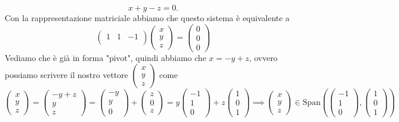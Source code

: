 $$
  x + y - z = 0.
$$
Con la rappresentazione matriciale abbiamo che questo sistema è equivalente a
$$
  \begin{pmatrix}
    1 & 1 & -1 \\
  \end{pmatrix} \begin{pmatrix}
  x \\
  y \\
  z
  \end{pmatrix} = \begin{pmatrix}
  0 \\
  0 \\
  0
  \end{pmatrix}
$$
Vediamo che è già in forma "pivot", quindi abbiamo che $x = -y + z$, ovvero possiamo scrivere il nostro vettore $\begin{pmatrix}
x \\
y \\
z
\end{pmatrix}$ come
$$
  \begin{pmatrix}
  x \\
  y \\
  z
  \end{pmatrix} = \begin{pmatrix}
    -y + z \\
    y \\
    z
  \end{pmatrix} = \begin{pmatrix}
    -y \\
    y \\
    0
  \end{pmatrix} + \begin{pmatrix}
    z \\
    0 \\
    z
  \end{pmatrix} = y\begin{pmatrix}
    -1 \\
    1 \\
    0
  \end{pmatrix} + z\begin{pmatrix}
    1 \\
    0 \\
    1
  \end{pmatrix} \implies \begin{pmatrix}
  x \\
  y \\
  z
  \end{pmatrix} \in \text{Span}\left(\begin{pmatrix}
    -1 \\
    1 \\
    0
  \end{pmatrix}, \begin{pmatrix} 1 \\ 0 \\ 1 \end{pmatrix} \right)
$$
